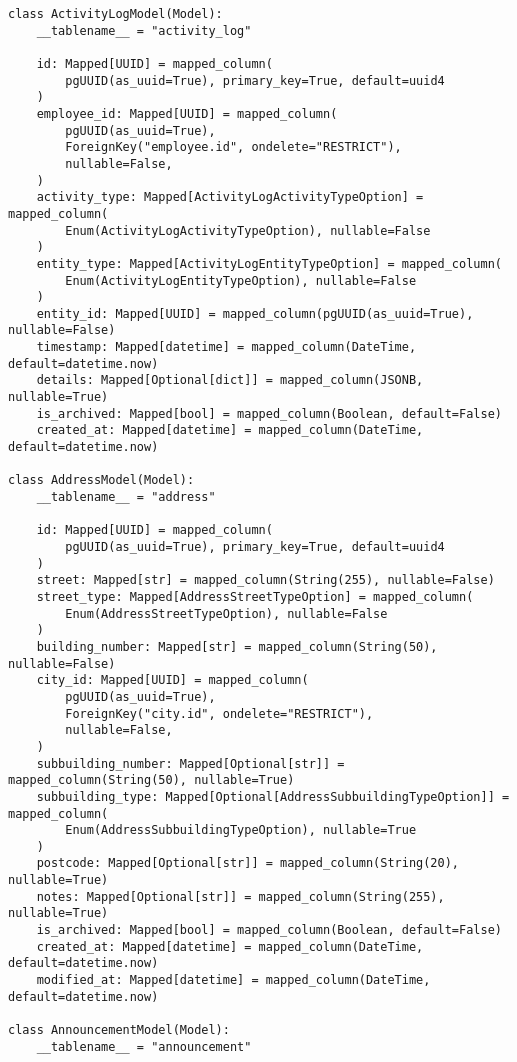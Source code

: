 \begin{lstlisting}[style=pythonstyle]
class ActivityLogModel(Model):
    __tablename__ = "activity_log"

    id: Mapped[UUID] = mapped_column(
        pgUUID(as_uuid=True), primary_key=True, default=uuid4
    )
    employee_id: Mapped[UUID] = mapped_column(
        pgUUID(as_uuid=True),
        ForeignKey("employee.id", ondelete="RESTRICT"),
        nullable=False,
    )
    activity_type: Mapped[ActivityLogActivityTypeOption] = mapped_column(
        Enum(ActivityLogActivityTypeOption), nullable=False
    )
    entity_type: Mapped[ActivityLogEntityTypeOption] = mapped_column(
        Enum(ActivityLogEntityTypeOption), nullable=False
    )
    entity_id: Mapped[UUID] = mapped_column(pgUUID(as_uuid=True), nullable=False)
    timestamp: Mapped[datetime] = mapped_column(DateTime, default=datetime.now)
    details: Mapped[Optional[dict]] = mapped_column(JSONB, nullable=True)
    is_archived: Mapped[bool] = mapped_column(Boolean, default=False)
    created_at: Mapped[datetime] = mapped_column(DateTime, default=datetime.now)

class AddressModel(Model):
    __tablename__ = "address"

    id: Mapped[UUID] = mapped_column(
        pgUUID(as_uuid=True), primary_key=True, default=uuid4
    )
    street: Mapped[str] = mapped_column(String(255), nullable=False)
    street_type: Mapped[AddressStreetTypeOption] = mapped_column(
        Enum(AddressStreetTypeOption), nullable=False
    )
    building_number: Mapped[str] = mapped_column(String(50), nullable=False)
    city_id: Mapped[UUID] = mapped_column(
        pgUUID(as_uuid=True),
        ForeignKey("city.id", ondelete="RESTRICT"),
        nullable=False,
    )
    subbuilding_number: Mapped[Optional[str]] = mapped_column(String(50), nullable=True)
    subbuilding_type: Mapped[Optional[AddressSubbuildingTypeOption]] = mapped_column(
        Enum(AddressSubbuildingTypeOption), nullable=True
    )
    postcode: Mapped[Optional[str]] = mapped_column(String(20), nullable=True)
    notes: Mapped[Optional[str]] = mapped_column(String(255), nullable=True)
    is_archived: Mapped[bool] = mapped_column(Boolean, default=False)
    created_at: Mapped[datetime] = mapped_column(DateTime, default=datetime.now)
    modified_at: Mapped[datetime] = mapped_column(DateTime, default=datetime.now)

class AnnouncementModel(Model):
    __tablename__ = "announcement"


\end{lstlisting}
